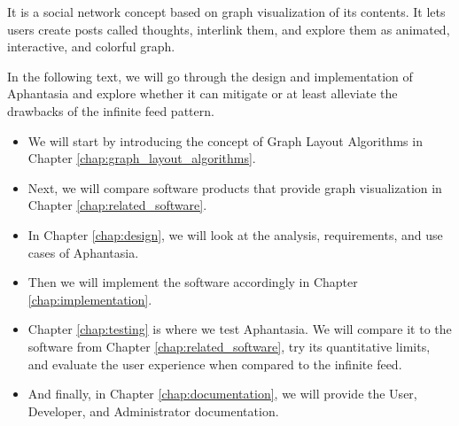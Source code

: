 It is a social network concept based on graph visualization of its contents.
It lets users create posts called thoughts, interlink them, and explore them as animated, interactive, and colorful graph.

In the following text, we will go through the design and implementation of Aphantasia and
explore whether it can mitigate or at least alleviate the drawbacks of the infinite feed pattern.

\begin{itemize}
  \item We will start by introducing the concept of Graph Layout Algorithms in Chapter \ref{chap:graph_layout_algorithms}.
  \item Next, we will compare software products that provide graph visualization in Chapter \ref{chap:related_software}.
  \item In Chapter \ref{chap:design}, we will look at the analysis, requirements, and use cases of Aphantasia.
  \item Then we will implement the software accordingly in Chapter \ref{chap:implementation}.
  \item Chapter \ref{chap:testing} is where we test Aphantasia.
 We will compare it to the software from Chapter \ref{chap:related_software},
 try its quantitative limits, and evaluate the user experience when compared to the infinite feed.
  \item And finally, in Chapter \ref{chap:documentation}, we will provide the User, Developer, and Administrator documentation.
\end{itemize}